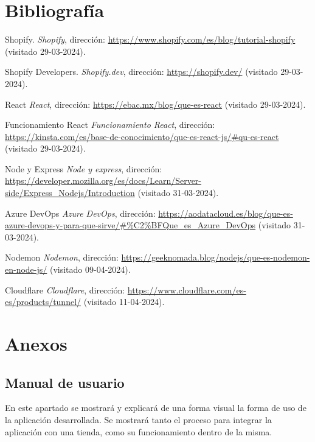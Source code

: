 \documentclass[12pt]{article}
\begin{document}
\section{Bibliografía}
\renewcommand{\refname}{}
\begin{thebibliography}{100} %
    
    Shopify. 
    \textit{Shopify}, dirección: \url{https://www.shopify.com/es/blog/tutorial-shopify} (visitado 29-03-2024).

    Shopify Developers. 
    \textit{Shopify.dev}, dirección: \url{https://shopify.dev/} (visitado 29-03-2024).

    React
    \textit{React}, dirección: \url{https://ebac.mx/blog/que-es-react} (visitado 29-03-2024).

    Funcionamiento React
    \textit{Funcionamiento React}, dirección: \url{https://kinsta.com/es/base-de-conocimiento/que-es-react-js/#qu-es-react} (visitado 29-03-2024).

    Node y Express
    \textit{Node y express}, dirección: \url{https://developer.mozilla.org/es/docs/Learn/Server-side/Express_Nodejs/Introduction} (visitado 31-03-2024).

    Azure DevOps
    \textit{Azure DevOps}, dirección: \url{https://aodatacloud.es/blog/que-es-azure-devops-y-para-que-sirve/#%C2%BFQue_es_Azure_DevOps} (visitado 31-03-2024).

    Nodemon
    \textit{Nodemon}, dirección: \url{https://geeknomada.blog/nodejs/que-es-nodemon-en-node-js/} (visitado 09-04-2024).

    Cloudflare
    \textit{Cloudflare}, dirección: \url{https://www.cloudflare.com/es-es/products/tunnel/} (visitado 11-04-2024).

\end{thebibliography}

\section{Anexos}

\subsection{Manual de usuario}
En este apartado se mostrará y explicará de una forma visual la forma de uso de la aplicación desarrollada. Se mostrará tanto el proceso para integrar la aplicación con una tienda, como
su funcionamiento dentro de la misma.
\end{document}

